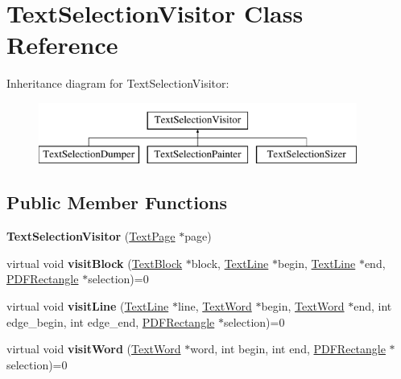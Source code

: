 \hypertarget{class_text_selection_visitor}{}\section{Text\+Selection\+Visitor Class Reference}
\label{class_text_selection_visitor}
Inheritance diagram for Text\+Selection\+Visitor\+:\begin{figure}[H]
\begin{center}
\leavevmode
\includegraphics[height=2.000000cm]{class_text_selection_visitor}
\end{center}
\end{figure}
\subsection*{Public Member Functions}
\begin{DoxyCompactItemize}
\item 
\mbox{\label{class_text_selection_visitor_ad6eac51c94b68147a6674645c7190d0b}} 
{\bfseries Text\+Selection\+Visitor} (\hyperlink{class_text_page}{Text\+Page} $\ast$page)
\item 
\mbox{\label{class_text_selection_visitor_a3aa1639e40f4d724bd18a3fdb166fcf0}} 
virtual void {\bfseries visit\+Block} (\hyperlink{class_text_block}{Text\+Block} $\ast$block, \hyperlink{class_text_line}{Text\+Line} $\ast$begin, \hyperlink{class_text_line}{Text\+Line} $\ast$end, \hyperlink{class_p_d_f_rectangle}{P\+D\+F\+Rectangle} $\ast$selection)=0
\item 
\mbox{\label{class_text_selection_visitor_aa9629b94203d9652a52a0ce7bc2beade}} 
virtual void {\bfseries visit\+Line} (\hyperlink{class_text_line}{Text\+Line} $\ast$line, \hyperlink{class_text_word}{Text\+Word} $\ast$begin, \hyperlink{class_text_word}{Text\+Word} $\ast$end, int edge\+\_\+begin, int edge\+\_\+end, \hyperlink{class_p_d_f_rectangle}{P\+D\+F\+Rectangle} $\ast$selection)=0
\item 
\mbox{\label{class_text_selection_visitor_aa4b6c26f9288d512ce12f337947ac7cd}} 
virtual void {\bfseries visit\+Word} (\hyperlink{class_text_word}{Text\+Word} $\ast$word, int begin, int end, \hyperlink{class_p_d_f_rectangle}{P\+D\+F\+Rectangle} $\ast$selection)=0
\end{DoxyCompactItemize}
